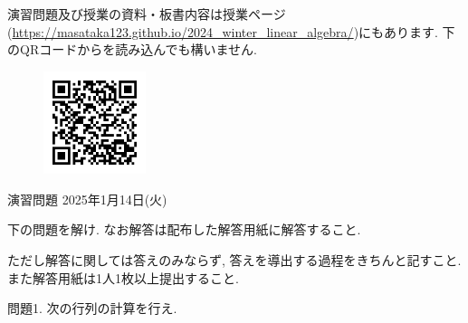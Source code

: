 \documentclass[dvipdfmx,a4paper,11pt]{article}
\theoremstyle{definition}
\begin{document}
演習問題及び授業の資料・板書内容は授業ページ(\url{https://masataka123.github.io/2024_winter_linear_algebra/})にもあります. 
下のQRコードからを読み込んでも構いません.
 \vspace{11pt}
\begin{figure}[h]
  \centering
 \includegraphics[height=30mm, width=30mm]{linalg.png}
\end{figure}




\newpage 

\begin{center}
{\Large 演習問題 2025年1月14日(火)} \\

\end{center}


\begin{center}
 {\large 下の問題を解け. なお解答は配布した解答用紙に解答すること.}
  \end{center}
 ただし解答に関しては答えのみならず, 答えを導出する過程をきちんと記すこと. 
 また解答用紙は1人1枚以上提出すること.
  
  \vspace{11pt}
 問題1. 次の行列の計算を行え.
 
\end{document}
